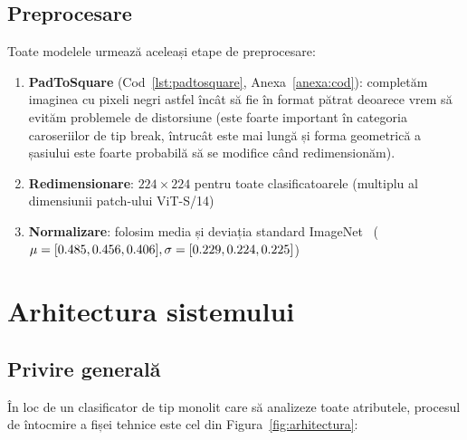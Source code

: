 \documentclass[12pt, a4paper, openany]{book}
\begin{document}
\section{Preprocesare}

Toate modelele urmează aceleași etape de preprocesare:

\begin{enumerate}
    \item \textbf{PadToSquare} (Cod~\ref{lst:padtosquare}, Anexa~\ref{anexa:cod}): completăm imaginea cu pixeli negri astfel încât să fie în format pătrat deoarece vrem să evităm problemele de distorsiune (este foarte important în categoria caroseriilor de tip break, întrucât este mai lungă și forma geometrică a șasiului este foarte probabilă să se modifice când redimensionăm).
    \item \textbf{Redimensionare}: $ 224 \times 224 $ pentru toate clasificatoarele (multiplu al dimensiunii patch-ului ViT-S/14)
    \item \textbf{Normalizare}: folosim media și deviația standard ImageNet~\cite{deng2009imagenet} ($ \mu= [0.485, 0.456, 0.406],  \\ \sigma=[0.229, 0.224, 0.225]$)
\end{enumerate}


\chapter{Arhitectura sistemului}

\section{Privire generală}

În loc de un clasificator de tip monolit care să analizeze toate atributele, procesul de întocmire a fișei tehnice este cel din Figura~\ref{fig:arhitectura}:
\end{document}
